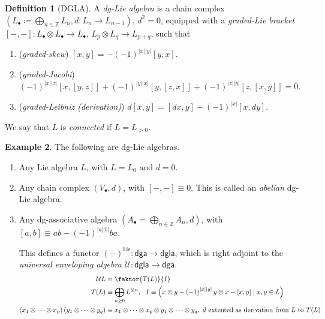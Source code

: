 \documentclass[10pt,letterpaper,cm]{nupset}
\theoremstyle{definition}
\newtheorem{defn}{Definition}[subsection]
\newtheorem{exmp}[defn]{Example}
\theoremstyle{theorem}
\theoremstyle{remark}
\newcommand{\U}{\mathcal U}
\newcommand{\Z}{\mathbb Z}
\newcommand{\1}{\mathbb{1}}
\newcommand{\0}{\vec 0}
\newcommand{\be}{\begin{enumerate}}
\newcommand{\ee}{\end{enumerate}}
\begin{document}
\begin{defn}[DGLA]
A \textit{dg-Lie algebra} is a chain complex $\left(L_{\bullet} \coloneqq \bigoplus_{n \in \Z} L_n, d : L_n \to L_{n-1}\right)$, $d^2 =0$, equipped with a \textit{graded-Lie bracket} $\left[{-}, {-}\right] : L_{\bullet} \otimes L_{\bullet} \to L_{\bullet}$, $L_p \otimes L_q \to L_{p+q}$, such that
\be[label=(\arabic*)]
\item (\textit{graded-skew}) $\left[x,y\right] = {-\left({-1}\right)^{\left\lvert{x}\right\rvert \left\lvert{y}\right\rvert}\left[y,x\right]}$.
\item (\textit{graded-Jacobi}) $\left({-1}\right)^{\left\lvert{x}\right\rvert \left\lvert{z}\right\rvert}\left[x, \left[y, z\right]\right] +
\left({-1}\right)^{\left\lvert{y}\right\rvert \left\lvert{x}\right\rvert}\left[y, \left[z, x\right]\right] + 
\left({-1}\right)^{\left\lvert{z}\right\rvert \left\lvert{y}\right\rvert}\left[z, \left[x, y\right]\right]
= 0$.
\item (\textit{graded-Leibniz (derivation)}) $d{\left[x,y\right]} = \left[d{x},y\right] + \left({-1}\right)^{\left\lvert{x}\right\rvert}\left[x,d{y}\right]$.
\ee
\end{defn}

We say that $L$ is \textit{connected} if $L = L_{>0}$. 

\begin{exmp} The following are dg-Lie algebras.
\be
\item Any Lie algebra $L$, with $L = L_0$ and $d =0$.
\item Any chain complex $\left(V_{\bullet}, d\right)$, with $\left[{-}, {-}\right] \equiv 0$. This is called an \textit{abelian} dg-Lie algebra.
\item Any dg-associative algebra $\left( A_{\bullet} = \bigoplus_{n \in \Z} A_n, d\right)$, with $\left[a,b\right] \equiv ab - \left({-1}\right)^{\left\lvert{a}\right\rvert \left\lvert{b}\right\rvert}ba$.

This defines a functor $\left({-}\right)^{\mathsf{Lie}} : \mathsf{dga} \to \mathsf{dgla}$,  which is right adjoint to the \textit{universal enveloping algebra} $\U : \mathsf{dgla} \to \mathsf{dga}$.
\begin{align*}
\U{L} &  \equiv \faktor{T(L)}{I}
\\ T(L) & \equiv \bigoplus_{n \geq 0}L^{\otimes n}, \ \ I  \equiv  \left(x \otimes y - \left({-1}\right)^{\left\lvert{x}\right\rvert \left\lvert{y}\right\rvert} y \otimes x - \left[x,y\right] \mid x, y \in L\right)
\\ \left(x_1 \otimes \cdots \otimes x_p\right) \left(y_1 \otimes \cdots \otimes y_q\right) & \equiv x_1 \otimes \cdots \otimes x_p \otimes y_1 \otimes \cdots \otimes y_q,\   \text{$d$ extented as derivation from $L$ to $T(L)$}
\end{align*}
\ee
\end{exmp}
\end{document}
